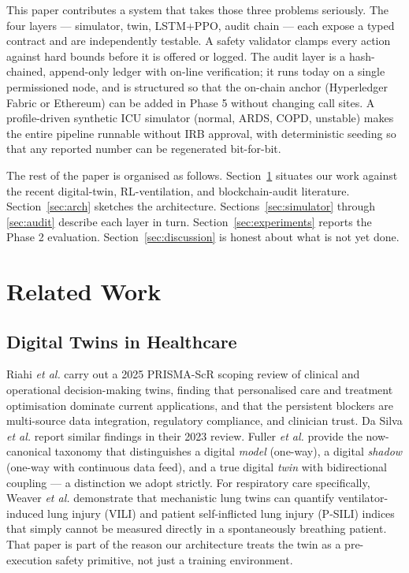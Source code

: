 \documentclass[conference]{IEEEtran}
\begin{document}
This paper contributes a system that takes those three problems seriously. The four layers --- simulator, twin, LSTM+PPO, audit chain --- each expose a typed contract and are independently testable. A safety validator clamps every action against hard bounds before it is offered or logged. The audit layer is a hash-chained, append-only ledger with on-line verification; it runs today on a single permissioned node, and is structured so that the on-chain anchor (Hyperledger Fabric or Ethereum) can be added in Phase 5 without changing call sites. A profile-driven synthetic ICU simulator (normal, ARDS, COPD, unstable) makes the entire pipeline runnable without IRB approval, with deterministic seeding so that any reported number can be regenerated bit-for-bit.

The rest of the paper is organised as follows. Section~\ref{sec:related} situates our work against the recent digital-twin, RL-ventilation, and blockchain-audit literature. Section~\ref{sec:arch} sketches the architecture. Sections~\ref{sec:simulator} through \ref{sec:audit} describe each layer in turn. Section~\ref{sec:experiments} reports the Phase 2 evaluation. Section~\ref{sec:discussion} is honest about what is not yet done.

\section{Related Work}
\label{sec:related}

\subsection{Digital Twins in Healthcare}
Riahi \emph{et al.} \cite{riahi2025dt_scoping} carry out a 2025 PRISMA-ScR scoping review of clinical and operational decision-making twins, finding that personalised care and treatment optimisation dominate current applications, and that the persistent blockers are multi-source data integration, regulatory compliance, and clinician trust. Da Silva \emph{et al.} \cite{dasilva2023dt_review} report similar findings in their 2023 review. Fuller \emph{et al.} \cite{fuller2020dt_enabling} provide the now-canonical taxonomy that distinguishes a digital \emph{model} (one-way), a digital \emph{shadow} (one-way with continuous data feed), and a true digital \emph{twin} with bidirectional coupling --- a distinction we adopt strictly. For respiratory care specifically, Weaver \emph{et al.} \cite{weaver2024dt_vili} demonstrate that mechanistic lung twins can quantify ventilator-induced lung injury (VILI) and patient self-inflicted lung injury (P-SILI) indices that simply cannot be measured directly in a spontaneously breathing patient. That paper is part of the reason our architecture treats the twin as a pre-execution safety primitive, not just a training environment.
\end{document}
